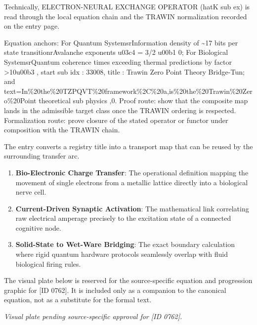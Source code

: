 Technically, ELECTRON-NEURAL EXCHANGE OPERATOR (hatK sub ex) is read through the local equation chain and the TRAWIN normalization recorded on the entry page.

Equation anchors: For Quantum SystemsrInformation density of \textasciitilde{}17 bits per state transitionrAvalanche exponents u03c4 = 3/2 u00b1 0; For Biological SystemsrQuantum coherence times exceeding thermal predictions by factor >10u00b3 , start sub idx : 33008, title : Trawin Zero Point Theory Bridge-Tun; and text=In\%20the\%20TZPQVT\%20framework\%2C\%20a,is\%20the\%20Trawin\%20Zero\%20Point theoretical sub physics ,0. Proof route: show that the composite map lands in the admissible target class once the TRAWIN ordering is respected. Formalization route: prove closure of the stated operator or functor under composition with the TRAWIN chain.

The entry converts a registry title into a transport map that can be reused by the surrounding transfer arc.
\endgroup

\begin{enumerate}[leftmargin=1.6em,itemsep=6pt,topsep=4pt]
\item \textbf{Bio-Electronic Charge Transfer}: The operational definition mapping the movement of single electrons from a metallic lattice directly into a biological nerve cell.
\item \textbf{Current-Driven Synaptic Activation}: The mathematical link correlating raw electrical amperage precisely to the excitation state of a connected cognitive node.
\item \textbf{Solid-State to Wet-Ware Bridging}: The exact boundary calculation where rigid quantum hardware protocols seamlessly overlap with fluid biological firing rules.
\end{enumerate}

\begingroup\footnotesize\sloppy
The visual plate below is reserved for the source-specific equation and progression graphic for [ID 0762]. It is included only as a companion to the canonical equation, not as a substitute for the formal text.
\par\endgroup
\begingroup\footnotesize\itshape
Visual plate pending source-specific approval for [ID 0762].
\par\endgroup


